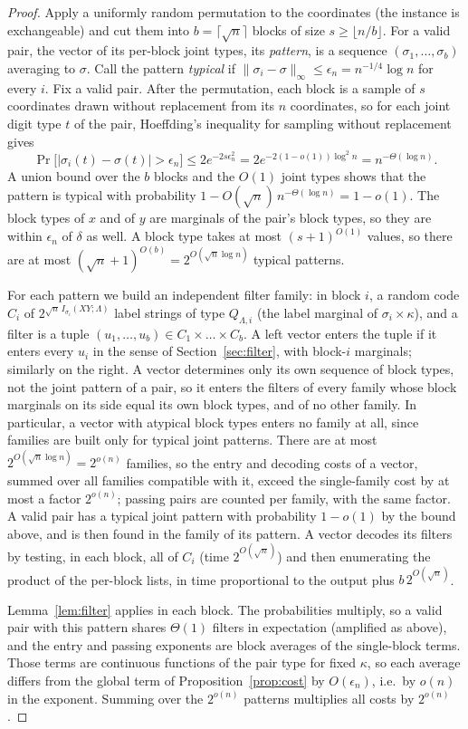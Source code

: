 \documentclass[11pt]{article}
\theoremstyle{definition}
\theoremstyle{remark}
\begin{document}
\begin{proof}
Apply a uniformly random permutation to the coordinates (the instance is exchangeable) and cut them into
$b=\lceil\sqrt n\rceil$ blocks of size $s\ge\lfloor n/b\rfloor$. For a valid pair, the vector of its per-block joint
types, its \emph{pattern}, is a sequence $(\sigma_1,\dots,\sigma_b)$ averaging to $\sigma$. Call the pattern
\emph{typical} if $\|\sigma_i-\sigma\|_\infty\le\epsilon_n=n^{-1/4}\log n$ for every $i$. Fix a valid pair. After the
permutation, each block is a sample of $s$ coordinates drawn without replacement from its $n$ coordinates, so for each
joint digit type $t$ of the pair, Hoeffding's inequality for sampling without replacement~\cite[\S6]{Hoe63} gives
\[
\Pr\bigl[|\sigma_i(t)-\sigma(t)|>\epsilon_n\bigr]\le2e^{-2s\epsilon_n^2}=2e^{-2(1-o(1))\log^2 n}=n^{-\Theta(\log n)} .
\]
A union bound over the $b$ blocks and the $O(1)$ joint types shows that the pattern is typical with probability
$1-O(\sqrt n)\,n^{-\Theta(\log n)}=1-o(1)$. The block types of $x$ and of $y$ are marginals of the pair's block
types, so they are within $\epsilon_n$ of $\delta$ as well. A block type takes at most $(s+1)^{O(1)}$ values, so there
are at most $(\sqrt n+1)^{O(b)}=2^{O(\sqrt n\log n)}$ typical patterns.

For each pattern we build an independent filter family: in block $i$, a random code $C_i$ of
$2^{\sqrt n\, I_{\sigma_i}(XY;\Lambda)}$ label strings of type $Q_{\Lambda,i}$ (the label marginal of
$\sigma_i\times\kappa$), and a filter is a tuple $(u_1,\dots,u_b)\in C_1\times\dots\times C_b$. A left vector enters the
tuple if it enters every $u_i$ in the sense of Section~\ref{sec:filter}, with block-$i$ marginals; similarly on the
right. A vector determines only its own sequence of block types, not the joint pattern of a pair, so it enters the
filters of every family whose block marginals on its side equal its own block types, and of no other family. In
particular, a vector with atypical block types enters no family at all, since families are built only for typical
joint patterns. There are at most $2^{O(\sqrt n\log n)}=2^{o(n)}$ families, so the entry and decoding costs of a
vector, summed over all families compatible with it, exceed the single-family cost by at most a factor $2^{o(n)}$;
passing pairs are counted per family, with the same factor. A valid pair has a typical joint pattern with
probability $1-o(1)$ by the bound above, and is then found in the family of its pattern. A vector decodes its filters by testing, in each block, all of $C_i$ (time $2^{O(\sqrt n)}$) and then
enumerating the product of the per-block lists, in time proportional to the output plus $b\,2^{O(\sqrt n)}$.

Lemma~\ref{lem:filter} applies in each block. The probabilities multiply, so a valid pair with this pattern shares
$\Theta(1)$ filters in expectation (amplified as above), and the entry and passing exponents are block averages of the
single-block terms. Those terms are continuous functions of the pair type for fixed $\kappa$, so each average differs
from the global term of Proposition~\ref{prop:cost} by $O(\epsilon_n)$, i.e.\ by $o(n)$ in the exponent. Summing over
the $2^{o(n)}$ patterns multiplies all costs by $2^{o(n)}$.
\end{proof}
\end{document}
